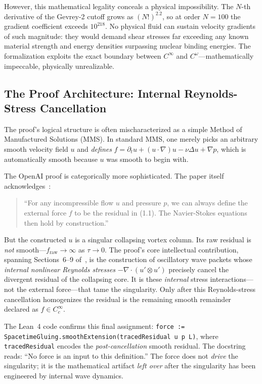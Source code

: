 \documentclass[11pt,a4paper]{article}
\begin{document}
However, this mathematical legality conceals a physical impossibility. The $N$-th derivative of
the Gevrey-2 cutoff grows as $(N!)^{2.2}$, so at order $N = 100$ the gradient coefficient exceeds
$10^{218}$. No physical fluid can sustain velocity gradients of such magnitude: they would demand
shear stresses far exceeding any known material strength and energy densities surpassing nuclear
binding energies. The formalization exploits the exact boundary between $C^\infty$ and
$C^\omega$---mathematically impeccable, physically unrealizable.

\subsection{The Proof Architecture: Internal Reynolds-Stress Cancellation}

The proof's logical structure is often mischaracterized as a simple Method of Manufactured
Solutions (MMS). In standard MMS, one merely picks an arbitrary smooth velocity field $u$ and
\emph{defines} $f = \partial_t u + (u\cdot\nabla)u - \nu\Delta u + \nabla p$, which is
automatically smooth because $u$ was smooth to begin with.

The OpenAI proof is categorically more sophisticated. The paper itself
acknowledges~\cite{OpenAI2026}:
\begin{quote}
  ``For any incompressible flow $u$ and pressure $p$, we can always define the external force $f$
  to be the residual in (1.1). The Navier-Stokes equations then hold by construction.''
\end{quote}
But the constructed $u$ is a singular collapsing vortex column. Its raw residual is \emph{not}
smooth---$f_{\text{raw}} \to \infty$ as $\tau \to 0$. The proof's core intellectual contribution,
spanning Sections~6--9 of~\cite{OpenAI2026}, is the construction of oscillatory wave packets
whose \emph{internal nonlinear Reynolds stresses} $-\nabla\cdot(u'\otimes u')$ precisely cancel
the divergent residual of the collapsing core. It is these \emph{internal} stress interactions---
not the external force---that tame the singularity. Only after this Reynolds-stress cancellation
homogenizes the residual is the remaining smooth remainder declared as $f \in C_c^\infty$.

{\sloppy The Lean~4 code confirms this final assignment:
\texttt{force := SpacetimeGluing.smoothExtension(tracedResidual u p L)},
where \texttt{tracedResidual} encodes the \emph{post-cancellation} smooth residual. The
docstring reads: ``No force is an input to this definition.'' The force does not \emph{drive}
the singularity; it is the mathematical artifact \emph{left over} after the singularity has been
engineered by internal wave dynamics.\par}
\end{document}
